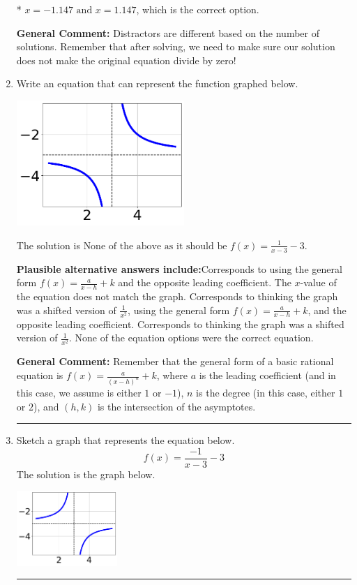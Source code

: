 \documentclass{extbook}[14pt]
\newcommand{\litem}[1]{\item #1

\rule{\textwidth}{0.4pt}}
\begin{document}
\begin{enumerate}
{\begin{enumerate}[label=\Alph*.]
* $x = -1.147 \text{ and } x = 1.147$, which is the correct option.


\end{enumerate}

\textbf{General Comment:} Distractors are different based on the number of solutions. Remember that after solving, we need to make sure our solution does not make the original equation divide by zero!
}
\litem{
Write an equation that can represent the function graphed below.

\begin{center}
    \includegraphics[width=0.5\textwidth]{../Figures/rationalGraphToEquationCopyC.png}
\end{center}


The solution is \( \text{None of the above as it should be } f(x) = \frac{1}{x - 3} - 3 \).\begin{enumerate}[label=\Alph*.]
\textbf{Plausible alternative answers include:}Corresponds to using the general form $f(x) = \frac{a}{x-h}+k$ and the opposite leading coefficient.
The $x$-value of the equation does not match the graph.
Corresponds to thinking the graph was a shifted version of $\frac{1}{x^2}$, using the general form $f(x) = \frac{a}{x-h}+k$, and the opposite leading coefficient.
Corresponds to thinking the graph was a shifted version of $\frac{1}{x^2}$.
None of the equation options were the correct equation.
\end{enumerate}

\textbf{General Comment:} Remember that the general form of a basic rational equation is $ f(x) = \frac{a}{(x-h)^n} + k$, where $a$ is the leading coefficient (and in this case, we assume is either $1$ or $-1$), $n$ is the degree (in this case, either $1$ or $2$), and $(h, k)$ is the intersection of the asymptotes.
}
\litem{
Sketch a graph that represents the equation below.
\[ f(x) = \frac{-1}{x - 3} - 3 \]The solution is the graph below.
    \begin{center}
        \includegraphics[width=0.3\textwidth]{../Figures/rationalEquationToGraphCopyAC.png}
    \end{center}

}
\end{enumerate}
\end{document}
